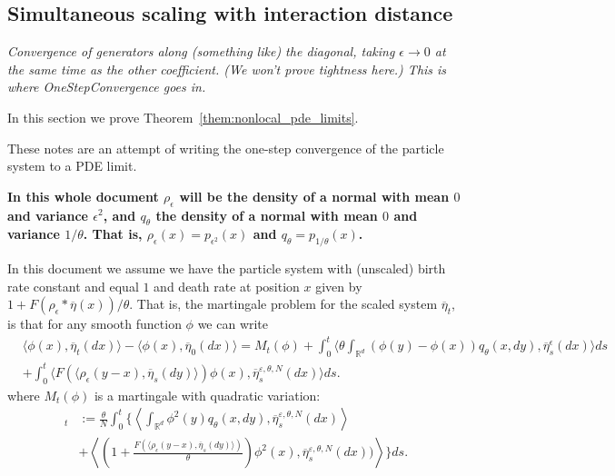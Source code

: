 \documentclass[12pt]{article}
\newcommand{\comment}[1]{{\color{blue} \it #1}}
\begin{document}
\subsection{Simultaneous scaling with interaction distance}

\comment{
    Convergence of generators along (something like) the diagonal,
    taking $\epsilon \to 0$ at the same time as the other coefficient.
    (We won't prove tightness here.)
    This is where OneStepConvergence goes in.
}

In this section we prove Theorem~\ref{them:nonlocal_pde_limits}.

These notes are an attempt of writing the one-step convergence of the particle system to a PDE limit.

\textbf{In this whole document $\rho_\epsilon$ will be the density of a normal with mean $0$ and variance $\epsilon^2$, and $q_\theta$ the density of a normal with mean $0$ and variance $1/\theta$. That is, $\rho_\epsilon(x) = p_{\epsilon^2}(x)$ and $q_\theta = p_{1/\theta}(x)$.}

In this document we assume we have the particle system with (unscaled) birth rate constant and equal $1$ and death rate at position $x$ given by $1+F(\rho_\epsilon*\overline{\eta}(x))/\theta$. That is, the martingale problem for the scaled system $\overline{\eta}_t$, is that for any smooth function $\phi$ we can write
\begin{align}
&\langle\phi(x),\overline{\eta}_{t}(dx)\rangle-\langle\phi(x),\overline{\eta}_{0}(dx)\rangle = M_t(\phi)   + \int_{0}^{t}\langle \theta  \int_{\mathbb{R}^d} \left( \phi(y)-\phi(x)\right) q_\theta(x,dy), \overline{\eta}_s^\epsilon(dx) \rangle ds \nonumber \\
 & + \int_0^t \langle  F(\langle \rho_\epsilon(y-x), \overline{\eta}_s(dy) \rangle)\phi(x),\overline{\eta}_s^{\varepsilon, \theta, N}(dx)  \rangle ds. \label{mgp1}
\end{align}
where $M_t(\phi)$ is a martingale with quadratic variation:
\begin{align}
[M(\phi)]_t&:=\frac{\theta}{N}\int_{0}^{t}\bigg\{ \left\langle \int_{\mathbb{R}^d} \phi^2(y) q_\theta(x,dy), \overline{\eta}_s^{\varepsilon, \theta, N}(dx) \right\rangle \nonumber\\
&+ \left\langle  \left(1 + \frac{F(\langle \rho_\epsilon(y-x), \overline{\eta}_s(dy)\rangle )}{\theta } \right)\phi^2(x), \overline{\eta}_s^{\varepsilon, \theta, N}(dx))\right\rangle   \bigg\}ds.  \label{mgp2}
\end{align}
\end{document}
